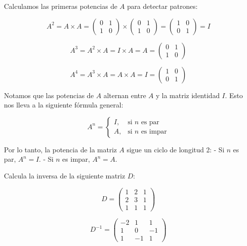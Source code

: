 \documentclass{exam}
\begin{document}
\begin{questions}
\begin{solution}
Calculamos las primeras potencias de \( A \) para detectar patrones:

\[
A^2 = A \times A = \begin{pmatrix} 0 & 1 \\ 1 & 0 \end{pmatrix} \times \begin{pmatrix} 0 & 1 \\ 1 & 0 \end{pmatrix} = \begin{pmatrix} 1 & 0 \\ 0 & 1 \end{pmatrix} = I
\]

\[
A^3 = A^2 \times A = I \times A = A = \begin{pmatrix} 0 & 1 \\ 1 & 0 \end{pmatrix}
\]

\[
A^4 = A^3 \times A = A \times A = I = \begin{pmatrix} 1 & 0 \\ 0 & 1 \end{pmatrix}
\]

Notamos que las potencias de \( A \) alternan entre \( A \) y la matriz identidad \( I \). Esto nos lleva a la siguiente fórmula general:

\[
A^n = \begin{cases} 
I, & \text{si } n \text{ es par} \\
A, & \text{si } n \text{ es impar} 
\end{cases}
\]

Por lo tanto, la potencia de la matriz \( A \) sigue un ciclo de longitud 2:
- Si \( n \) es par, \( A^n = I \).
- Si \( n \) es impar, \( A^n = A \).

\end{solution}

\newpage


\question Calcula la inversa de la siguiente matriz \(D\):

\[
D = \begin{pmatrix}
1 & 2 & 1 \\
2 & 3 & 1 \\
1 & 1 & 1
\end{pmatrix}
\]

\begin{solution}
    \[
D^{-1} = \begin{pmatrix}
-2 & 1 & 1 \\
1 & 0 & -1 \\
1 & -1 & 1
\end{pmatrix}
\]
\end{solution}


\end{questions}
\end{document}
